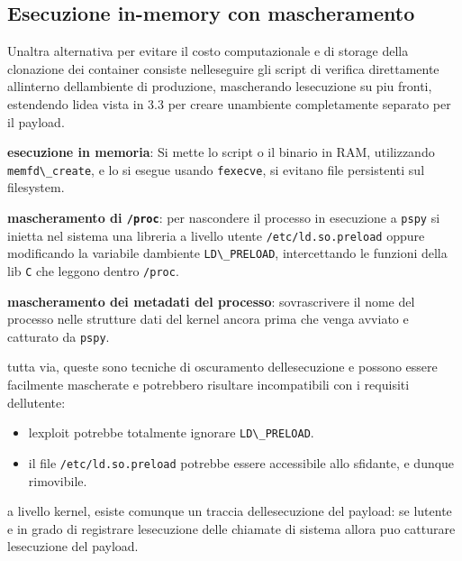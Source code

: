 \subsection{Esecuzione in-memory con
mascheramento}\label{esecuzione-in-memory-con-mascheramento}

Un\textquotesingle altra alternativa per evitare il costo computazionale
e di storage della clonazione dei container consiste
nell\textquotesingle eseguire gli script di verifica direttamente
all\textquotesingle interno dell\textquotesingle ambiente di produzione,
mascherando l\textquotesingle esecuzione su piu fronti, estendendo
l\textquotesingle idea vista in 3.3 per creare
un\textquotesingle ambiente completamente separato per il payload.

\textbf{esecuzione in memoria}: Si mette lo script o il binario in RAM,
utilizzando \passthrough{\lstinline!memfd\_create!}, e lo si esegue
usando \passthrough{\lstinline!fexecve!}, si evitano file persistenti
sul filesystem.

\textbf{mascheramento di \passthrough{\lstinline!/proc!}}: per
nascondere il processo in esecuzione a \passthrough{\lstinline!pspy!} si
inietta nel sistema una libreria a livello utente
\passthrough{\lstinline!/etc/ld.so.preload!} oppure modificando la
variabile d\textquotesingle ambiente
\passthrough{\lstinline!LD\_PRELOAD!}, intercettando le funzioni della
lib \passthrough{\lstinline!C!} che leggono dentro
\passthrough{\lstinline!/proc!}.

\textbf{mascheramento dei metadati del processo}: sovrascrivere il nome
del processo nelle strutture dati del kernel ancora prima che venga
avviato e catturato da \passthrough{\lstinline!pspy!}.

tutta via, queste sono tecniche di oscuramento
dell\textquotesingle esecuzione e possono essere facilmente mascherate e
potrebbero risultare incompatibili con i requisiti
dell\textquotesingle utente:

\begin{itemize}
\tightlist
\item
  l\textquotesingle exploit potrebbe totalmente ignorare
  \passthrough{\lstinline!LD\_PRELOAD!}.
\item
  il file \passthrough{\lstinline!/etc/ld.so.preload!} potrebbe essere
  accessibile allo sfidante, e dunque rimovibile.
\end{itemize}

a livello kernel, esiste comunque un traccia
dell\textquotesingle esecuzione del payload: se l\textquotesingle utente
e\textquotesingle{} in grado di registrare l\textquotesingle esecuzione
delle chiamate di sistema allora puo\textquotesingle{} catturare
l\textquotesingle esecuzione del payload.

